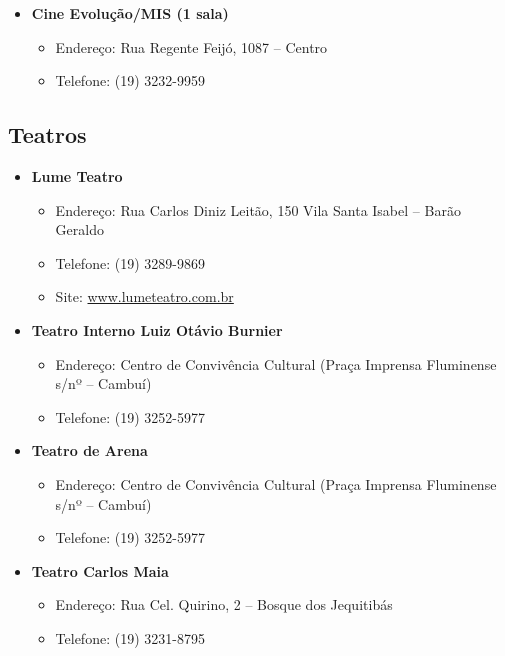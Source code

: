\begin{itemize}
\item  \textbf{Cine Evolução/MIS (1 sala)}
\begin{itemize}
\item  Endereço: Rua Regente Feijó, 1087 -- Centro
\item  Telefone: (19) 3232-9959
\end{itemize}
\end{itemize}

\subsection{Teatros}

\begin{itemize}
\item  \textbf{Lume Teatro}
    \begin{itemize}
        \item  Endereço:  Rua Carlos Diniz Leitão, 150 Vila Santa Isabel -- Barão Geraldo
        \item  Telefone: (19) 3289-9869
        \item  Site: \url{www.lumeteatro.com.br}
    \end{itemize}

\item  \textbf{Teatro Interno Luiz Otávio Burnier}
    \begin{itemize}
        \item  Endereço: Centro de Convivência Cultural (Praça Imprensa Fluminense s/nº -- Cambuí)
        \item  Telefone: (19) 3252-5977
    \end{itemize}

\item  \textbf{Teatro de Arena}
    \begin{itemize}
        \item  Endereço: Centro de Convivência Cultural (Praça Imprensa Fluminense s/nº -- Cambuí)
        \item  Telefone: (19) 3252-5977
    \end{itemize}

\item  \textbf{Teatro Carlos Maia}
    \begin{itemize}
        \item  Endereço: Rua Cel. Quirino, 2 -- Bosque dos Jequitibás
        \item  Telefone: (19) 3231-8795
    \end{itemize}


\end{itemize}
